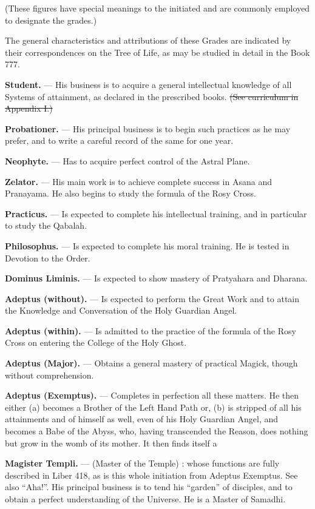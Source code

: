 (These figures have special meanings to the initiated and are commonly employed to designate the grades.)

The general characteristics and attributions of these Grades are indicated by their correspondences on the Tree of Life, as may be studied in detail in the Book 777.

\textbf{Student.} --- His business is to acquire a general intellectual knowledge of all Systems of attainment, as declared in the prescribed books. \sout{(See curriculum in Appendix I.)}

\textbf{Probationer.} --- His principal business is to begin such practices as he may prefer, and to write a careful record of the same for one year.

\textbf{Neophyte.} --- Has to acquire perfect control of the Astral Plane.

\textbf{Zelator.} --- His main work is to achieve complete success in Asana and Pranayama. He also begins to study the formula of the Rosy Cross.

\textbf{Practicus.} --- Is expected to complete his intellectual training, and in particular to study the Qabalah.

\textbf{Philosophus.} --- Is expected to complete his moral training. He is tested in Devotion to the Order.

\textbf{Dominus Liminis.} --- Is expected to show mastery of Pratyahara and Dharana.

\textbf{Adeptus (without).} --- Is expected to perform the Great Work and to attain the Knowledge and Conversation of the Holy Guardian Angel.

\textbf{Adeptus (within).} --- Is admitted to the practice of the formula of the Rosy Cross on entering the College of the Holy Ghost.

\textbf{Adeptus (Major).} --- Obtains a general mastery of practical Magick, though without comprehension.

\textbf{Adeptus (Exemptus).} --- Completes in perfection all these matters. He then either (a) becomes a Brother of the Left Hand Path or, (b)  is stripped of all his attainments and of himself as well, even of his Holy Guardian Angel, and becomes a Babe of the Abyss, who, having transcended the Reason, does nothing but grow in the womb of its mother. It then finds itself a

\textbf{Magister Templi.} --- (Master of the Temple) : whose functions are fully described in Liber 418, as is this whole initiation from Adeptus Exemptus. See also \enquote{Aha!}. His principal business is to tend his \enquote{garden} of disciples, and to obtain a perfect understanding of the Universe. He is a Master of Samadhi.

